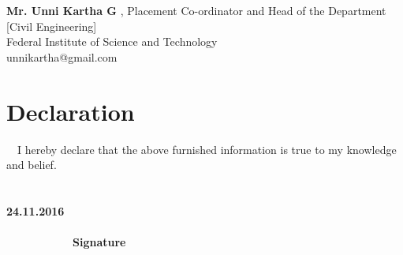 \documentclass[a4paper]{article}
\begin{document}
\textbf{Mr. Unni Kartha G} , Placement Co-ordinator  and Head of the Department [Civil Engineering] \\ 
\indent Federal Institute of Science and Technology\\ 
\indent unnikartha@gmail.com 

\section{Declaration}
\indent \ \ I hereby declare that the above furnished information is true to my knowledge and belief. \\ \\ \\
\vspace{5\baselineskip}
\indent \textbf {24.11.2016} \indent \ \ \ \ \ \ \ \ \ \ \ \ \ \ \ \ \ \ \ \ \ \ \ \ \ \ \ \ \ \ \ \ \ \ \ \ \ \ \ \ \ \ \ \ \ \ \ \ \ \ \ \ \ \ \ \ \ \ \ \ \ \ \ \ \ \ \ \ \ \ \ \ \ \ \ \ \ \ \ \ \ \ \ \ \textbf{Signature}
\end{document}
